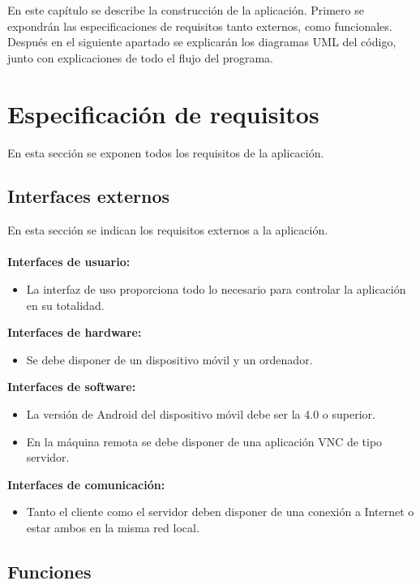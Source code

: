 En este capítulo se describe la construcción de la aplicación. Primero se expondrán las especificaciones de requisitos tanto externos, como funcionales. Después en el siguiente apartado se explicarán los diagramas UML del código, junto con explicaciones de todo el flujo del programa.

\section {Especificaci\'on de requisitos}

En esta sección se exponen todos los requisitos de la aplicación.

\subsection {Interfaces externos}

En esta sección se indican los requisitos externos a la aplicación.\\ \\
\textbf{Interfaces de usuario:}
\begin{itemize}
\item La interfaz de uso proporciona todo lo necesario para controlar la aplicación en su totalidad.\\
\end{itemize}
\textbf{Interfaces de hardware:}
\begin{itemize}
\item Se debe disponer de un dispositivo móvil y un ordenador.\\
\end{itemize}
\textbf{Interfaces de software:}
\begin{itemize}
\item La versión de Android del dispositivo móvil debe ser la 4.0 o superior.
\item En la máquina remota se debe disponer de una aplicación VNC de tipo servidor.\\
\end{itemize}
\textbf{Interfaces de comunicación:}
\begin{itemize}
\item Tanto el cliente como el servidor deben disponer de una conexión a Internet o estar ambos en la misma red local.\\
\end{itemize}
\subsection {Funciones}


